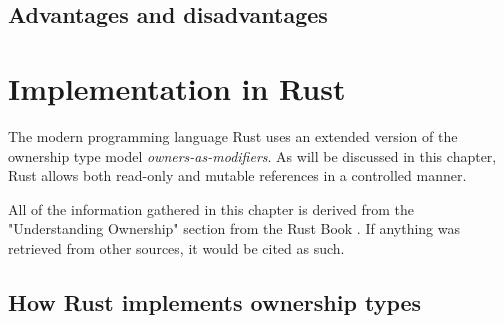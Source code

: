 \documentclass[sigplan,11pt,nonacm]{acmart}
\begin{document}
\subsection{Advantages and disadvantages}








\section{Implementation in Rust}
\label{sec:implementation-in-rust}

The modern programming language Rust uses an extended version of the ownership type model \emph{owners-as-modifiers}.
As will be discussed in this chapter, Rust allows both read-only and mutable references in a controlled manner.

All of the information gathered in this chapter is derived from the "Understanding Ownership" section from the Rust Book \cite{rust-book}.
If anything was retrieved from other sources, it would be cited as such.

\subsection{How Rust implements ownership types}
\label{sec:rust-ownership-types}




\end{document}
